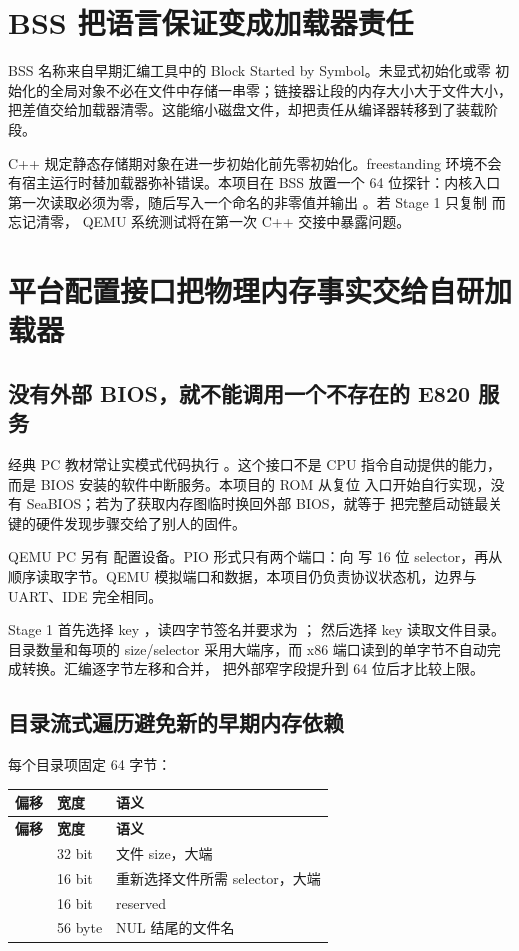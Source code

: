 \section{BSS 把语言保证变成加载器责任}

BSS 名称来自早期汇编工具中的 Block Started by Symbol。未显式初始化或零
初始化的全局对象不必在文件中存储一串零；链接器让段的内存大小大于文件大小，
把差值交给加载器清零。这能缩小磁盘文件，却把责任从编译器转移到了装载阶段。

C++ 规定静态存储期对象在进一步初始化前先零初始化。freestanding 环境不会
有宿主运行时替加载器弥补错误。本项目在 BSS 放置一个 64 位探针：内核入口
第一次读取必须为零，随后写入一个命名的非零值并输出
。若 Stage 1 只复制  而忘记清零，
QEMU 系统测试将在第一次 C++ 交接中暴露问题。

\section{平台配置接口把物理内存事实交给自研加载器}

\subsection{没有外部 BIOS，就不能调用一个不存在的 E820 服务}

经典 PC 教材常让实模式代码执行 。这个接口不是
CPU 指令自动提供的能力，而是 BIOS 安装的软件中断服务。本项目的 ROM 从复位
入口开始自行实现，没有 SeaBIOS；若为了获取内存图临时换回外部 BIOS，就等于
把完整启动链最关键的硬件发现步骤交给了别人的固件。

QEMU PC 另有  配置设备。PIO 形式只有两个端口：向
 写 16 位 selector，再从  顺序读取字节。QEMU
模拟端口和数据，本项目仍负责协议状态机，边界与 UART、IDE 完全相同。

Stage 1 首先选择 key ，读四字节签名并要求为 ；
然后选择 key  读取文件目录。目录数量和每项的 size/selector
采用大端序，而 x86 端口读到的单字节不自动完成转换。汇编逐字节左移和合并，
把外部窄字段提升到 64 位后才比较上限。

\subsection{目录流式遍历避免新的早期内存依赖}

每个目录项固定 64 字节：

\begin{longtable}{L{0.18\textwidth}L{0.19\textwidth}L{0.49\textwidth}}
\toprule
\textbf{偏移} & \textbf{宽度} & \textbf{语义}\\
\midrule
\endfirsthead
\toprule
\textbf{偏移} & \textbf{宽度} & \textbf{语义}\\
\midrule
\endhead
{} & 32 bit & 文件 size，大端\\
 & 16 bit & 重新选择文件所需 selector，大端\\
 & 16 bit & reserved\\
 & 56 byte & NUL 结尾的文件名\\
\bottomrule
\end{longtable}

